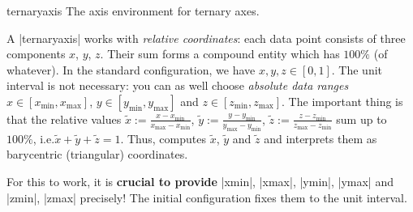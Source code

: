 \begin{environment}{{ternaryaxis}}
    The axis environment for ternary axes.
\begin{codeexample}[]
\end{codeexample}

    A |ternaryaxis| works with \emph{relative coordinates}: each data point
    consists of three components $x$, $y$, $z$. Their sum forms a compound
    entity which has $100\%$ (of whatever). In the standard configuration, we
    have $x,y,z \in [0,1]$. The unit interval is not necessary: you can as well
    choose \emph{absolute data ranges} $x \in [x_{\min},x_{\max}]$, $y \in
    [y_{\min},y_{\max}]$ and $z \in [z_{\min},z_{\max}]$. The important thing
    is that the relative values
            $\tilde x := \frac{x-x_{\min}}{x_{\max} - x_{\min}}$,
            $\tilde y := \frac{y-y_{\min}}{y_{\max} - y_{\min}}$,
            $\tilde z := \frac{z-z_{\min}}{z_{\max} - z_{\min}}$
    sum up to $100\%$, i.e.\@ $\tilde x + \tilde y + \tilde z = 1$. Thus,
    \PGFPlots{} computes $\tilde x$, $\tilde y$ and $\tilde z$ and interprets
    them as barycentric (triangular) coordinates.

    For this to work, it is \textbf{crucial to provide} |xmin|, |xmax|,
    |ymin|, |ymax| and |zmin|, |zmax| precisely! The initial configuration
    fixes them to the unit interval.


\end{environment}

